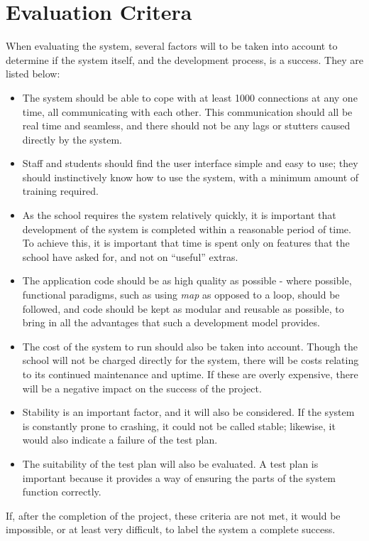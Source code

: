 \section{Evaluation Critera}
When evaluating the system, several factors will to be taken into account to determine if the system itself, and the development process, is a success. They are listed below:

\begin{itemize}
\item The system should be able to cope with at least 1000 connections at any one time, all communicating with each other. This communication should all be real time and seamless, and there should not be any lags or stutters caused directly by the system.
\item Staff and students should find the user interface simple and easy to use; they should instinctively know how to use the system, with a minimum amount of training required.
\item As the school requires the system relatively quickly, it is important that development of the system is completed within a reasonable period of time. To achieve this, it is important that time is spent only on features that the school have asked for, and not on ``useful'' extras.
\item The application code should be as high quality as possible - where possible, functional paradigms, such as using \textit{map} as opposed to a loop, should be followed, and code should be kept as modular and reusable as possible, to bring in all the advantages that such a development model provides.
\item The cost of the system to run should also be taken into account. Though the school will not be charged directly for the system, there will be costs relating to its continued maintenance and uptime. If these are overly expensive, there will be a negative impact on the success of the project.
\item Stability is an important factor, and it will also be considered. If the system is constantly prone to crashing, it could not be called stable; likewise, it would also indicate a failure of the test plan.
\item The suitability of the test plan will also be evaluated. A test plan is important because it provides a way of ensuring the parts of the system function correctly.
\end{itemize}

If, after the completion of the project, these criteria are not met, it would be impossible, or at least very difficult, to label the system a complete success.
